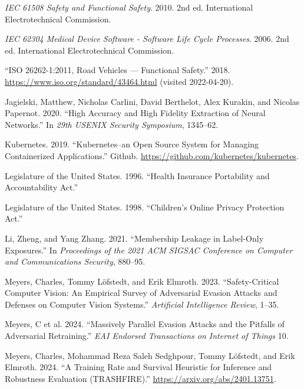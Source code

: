 \documentclass[
]{article}
\newlength{\cslhangindent}
\newlength{\cslentryspacingunit} %
\newenvironment{CSLReferences}[2] %
 {%
  \setlength{\parindent}{0pt}
  \ifodd #1
  \let\oldpar\par
  \def\par{\hangindent=\cslhangindent\oldpar}
  \fi
  \setlength{\parskip}{#2\cslentryspacingunit}
 }%
 {}
\begin{document}
\begin{CSLReferences}{1}{0}
\leavevmode{}%
\emph{IEC 61508 Safety and Functional Safety}. 2010. 2nd ed.
International Electrotechnical Commission.

\leavevmode{}%
\emph{IEC 62304 Medical Device Software - Software Life Cycle
Processes}. 2006. 2nd ed. International Electrotechnical Commission.

\leavevmode{}%
{``{ISO} 26262-1:2011, Road Vehicles --- Functional Safety.''} 2018.
\url{https://www.iso.org/standard/43464.html} (visited 2022-04-20).

\leavevmode{}%
Jagielski, Matthew, Nicholas Carlini, David Berthelot, Alex Kurakin, and
Nicolas Papernot. 2020. {``High Accuracy and High Fidelity Extraction of
Neural Networks.''} In \emph{29th USENIX Security Symposium}, 1345--62.

\leavevmode{}%
Kubernetes. 2019. {``Kubernetes--an Open Source System for Managing
Containerized Applications.''} Github.
\url{https://github.com/kubernetes/kubernetes}.

\leavevmode{}%
Legislature of the United States. 1996. {``Health Insurance Portability
and Accountability Act.''}

\leavevmode{}%
Legislature of the United States. 1998. {``Children's Online Privacy Protection Act.''}

\leavevmode{}%
Li, Zheng, and Yang Zhang. 2021. {``Membership Leakage in Label-Only
Exposures.''} In \emph{Proceedings of the 2021 ACM SIGSAC Conference on
Computer and Communications Security}, 880--95.

\leavevmode{}%
Meyers, Charles, Tommy Löfstedt, and Erik Elmroth. 2023.
{``Safety-Critical Computer Vision: An Empirical Survey of Adversarial
Evasion Attacks and Defenses on Computer Vision Systems.''}
\emph{Artificial Intelligence Review}, 1--35.

\leavevmode{}%
Meyers, C et al. 2024. {``Massively Parallel Evasion Attacks and the Pitfalls
of Adversarial Retraining.''} \emph{EAI Endorsed Transactions on
Internet of Things} 10.

\leavevmode{}%
Meyers, Charles, Mohammad Reza Saleh Sedghpour, Tommy Löfstedt, and Erik
Elmroth. 2024. {``A Training Rate and Survival Heuristic for Inference
and Robustness Evaluation (TRASHFIRE).''}
\url{https://arxiv.org/abs/2401.13751}.


\end{CSLReferences}
\end{document}
